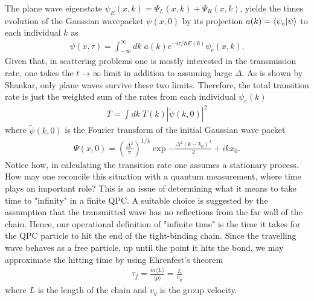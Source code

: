 \documentclass{article}
\begin{document}
The plane wave eigenstate $\psi_E(x,k) = \Psi_{L}(x,k) + \Psi_{R}(x,k)$, yields the 
times evolution of the Gaussian wavepacket $\psi(x,0)$ by its projection $a(k) = \bra{\psi_e}\ket{\psi}$
to each individual $k$ as 
\begin{align*}
    \psi (x,\tau) = \int_{-\infty}^{\infty} dk \; a(k) e^{-i \tau/\hbar E(k)} \psi_e(x,k).
\end{align*}
Given that, in scattering problems one is mostly interested in the transmission rate,
one takes the $t\rightarrow\infty$ limit in addition to assuming large $\Delta$. 
As is shown by Shankar, only plane waves survive these two limits. Therefore, the total transition rate
is just the weighted sum of the rates from each individual $\psi_e(k)$
\begin{align}\label{eq:transmision_coef}
    T = \int dk \; T(k) |\tilde{\psi}(k,0)|^2
\end{align}
where $\tilde{\psi}(k,0)$ is the Fourier transform of the initial Gaussian wave packet
\begin{align}
    \Psi(x,0) = \left(\frac{\Delta^2}{\pi}\right)^{1/4} \exp{ -\frac{\Delta^2(k-k_0)^2}{2} + i k x_0}.
\end{align}
Notice how, in calculating the transition rate one assumes a stationary process. How may one reconcile this situation with a quantum measurement, where time plays 
an important role? This is an issue of determining what it means to take time to "infinity" 
in a finite QPC. A suitable choice is suggested by the assumption that the transmitted
wave has no reflections from the far wall of the chain. Hence, our operational definition of "infinite
time" is the time it takes for the QPC particle to hit the end of the tight-binding chain. Since 
the travelling wave behaves as a free particle, up until the point it hits the bond, we may
 approximate the hitting time by using Ehrenfest's theorem 
\begin{align}
    \tau_f = \frac{m \langle L \rangle }{ \langle p \rangle} = \frac{L}{v_g}
\end{align}
where $L$ is the length of the chain and $v_g$ is the group velocity. 
\end{document}
